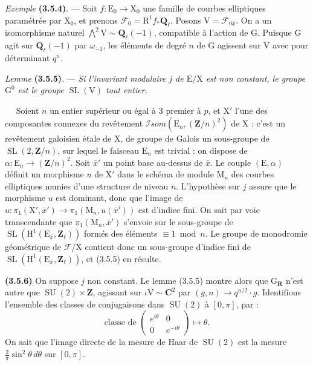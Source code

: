 \documentclass[11pt,leqno]{article}
\newcommand{\Page}[1]{\ifvmode\noindent\else\unskip\ \fi{\footnotesize\textcolor{gray}{[p.\,#1]}}\ \ignorespaces}
\begin{document}
\textit{Exemple} \textbf{(3.5.4)}. — Soit \(f:\mathrm E_0\to\mathrm X_0\) une famille de courbes elliptiques paramétrée par \(\mathrm X_0\), et prenons \(\mathscr F_0=\mathrm R^1f_*\mathbf Q_\ell\). Posons \(\mathrm V=\mathscr F_{0\bar x}\). On a un isomorphisme naturel \(\bigwedge\limits^{2}\mathrm V\sim\mathbf Q_\ell(-1)\), compatible à l’action de \(\mathrm G\). Puisque \(\mathrm G\) agit sur \(\mathbf Q_\ell(-1)\) par \(\omega_{-1}\), les éléments de degré \(n\) de \(\mathrm G\) agissent sur \(\mathrm V\) avec pour déterminant \(q^n\).

\textit{Lemme} \textbf{(3.5.5)}. — \textit{Si l’invariant modulaire \(j\) de \(\mathrm E/\mathrm X\) est non constant, le groupe \(\mathrm G^0\) est le groupe \(\operatorname{SL}(\mathrm V)\) tout entier.}

\Page{212}
Soient \(n\) un entier supérieur ou égal à \(3\) premier à \(p\), et \(\mathrm X'\) l’une des composantes connexes du revêtement \(\mathscr I\mathit{som}(\mathrm E_n,(\mathbf Z/n)^2)\) de \(\mathrm X\) : c’est un revêtement galoisien étale de \(\mathrm X\), de groupe de Galois un sous-groupe de \(\operatorname{SL}(2,\mathbf Z/n)\), sur lequel le faisceau \(\mathrm E_n\) est trivial : on dispose de \(\alpha:\mathrm E_n\to(\mathbf Z/n)^2\). Soit \(\bar x'\) un point base au-dessus de \(\bar x\). Le couple \((\mathrm E,\alpha)\) définit un morphisme \(u\) de \(\mathrm X'\) dans le schéma de module \(\mathrm M_n\) des courbes elliptiques munies d’une structure de niveau \(n\). L’hypothèse sur \(j\) assure que le morphisme \(u\) est dominant, donc que l’image de \(u:\pi_1(\mathrm X',\bar x')\to\pi_1(\mathrm M_n,u(\bar x'))\) est d’indice fini. On sait par voie transcendante que \(\pi_1(\mathrm M_n,\bar x')\) s’envoie sur le sous-groupe de \(\operatorname{SL}(\mathrm H^1(\mathrm E_{\bar x},\mathbf Z_\ell))\) formés des éléments \(\equiv1\bmod n\). Le groupe de monodromie géométrique de \(\mathscr F/\mathrm X\) contient donc un sous-groupe d’indice fini de \(\operatorname{SL}(\mathrm H^1(\mathrm E_{\bar x},\mathbf Z_\ell))\), et (3.5.5) en résulte.

\textbf{(3.5.6)} On suppose \(j\) non constant. Le lemme (3.5.5) montre alors que \(\mathrm G_{\mathbf R}\) n’est autre que \(\operatorname{SU}(2)\times\mathbf Z\), agissant sur \(\iota\mathrm V\sim\mathbf C^2\) par \((g,n)\to q^{n/2}\cdot g\). Identifions l’ensemble des classes de conjugaisons dans \(\operatorname{SU}(2)\) à \([0,\pi]\), par :
\[
\text{classe de }
\begin{pmatrix}
e^{i\theta}&0\\
0&e^{-i\theta}
\end{pmatrix}
\longmapsto\theta.
\]
On sait que l’image directe de la mesure de Haar de \(\operatorname{SU}(2)\) est la mesure \(\displaystyle\frac{2}{\pi}\sin^2\theta\,d\theta\) sur \([0,\pi]\).
\end{document}
